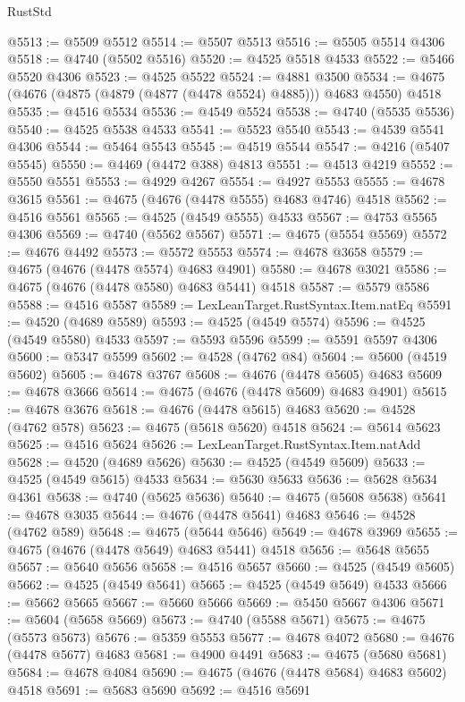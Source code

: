 \begin{lexlean}{RustStd}
\begin{coremodule}
{\begin{coremodule}
{{{{{{{{{{{{{{{{{{{{{{{{{{{{{{{{{{{{{{{{{{{{{{{{{{{{{{{{{{{{@5513 := @5509 @5512
@5514 := @5507 @5513
@5516 := @5505 @5514 @4306
@5518 := @4740 (@5502 @5516)
@5520 := @4525 @5518 @4533
@5522 := @5466 @5520 @4306
@5523 := @4525 @5522
@5524 := @4881 @3500
@5534 := @4675 (@4676 (@4875 (@4879 (@4877 (@4478 @5524) @4885))) @4683 @4550) @4518
@5535 := @4516 @5534
@5536 := @4549 @5524
@5538 := @4740 (@5535 @5536)
@5540 := @4525 @5538 @4533
@5541 := @5523 @5540
@5543 := @4539 @5541 @4306
@5544 := @5464 @5543
@5545 := @4519 @5544
@5547 := @4216 (@5407 @5545)
@5550 := @4469 (@4472 @388) @4813
@5551 := @4513 @4219
@5552 := @5550 @5551
@5553 := @4929 @4267
@5554 := @4927 @5553
@5555 := @4678 @3615
@5561 := @4675 (@4676 (@4478 @5555) @4683 @4746) @4518
@5562 := @4516 @5561
@5565 := @4525 (@4549 @5555) @4533
@5567 := @4753 @5565 @4306
@5569 := @4740 (@5562 @5567)
@5571 := @4675 (@5554 @5569)
@5572 := @4676 @4492
@5573 := @5572 @5553
@5574 := @4678 @3658
@5579 := @4675 (@4676 (@4478 @5574) @4683 @4901)
@5580 := @4678 @3021
@5586 := @4675 (@4676 (@4478 @5580) @4683 @5441) @4518
@5587 := @5579 @5586
@5588 := @4516 @5587
@5589 := LexLeanTarget.RustSyntax.Item.natEq
@5591 := @4520 (@4689 @5589)
@5593 := @4525 (@4549 @5574)
@5596 := @4525 (@4549 @5580) @4533
@5597 := @5593 @5596
@5599 := @5591 @5597 @4306
@5600 := @5347 @5599
@5602 := @4528 (@4762 @84)
@5604 := @5600 (@4519 @5602)
@5605 := @4678 @3767
@5608 := @4676 (@4478 @5605) @4683
@5609 := @4678 @3666
@5614 := @4675 (@4676 (@4478 @5609) @4683 @4901)
@5615 := @4678 @3676
@5618 := @4676 (@4478 @5615) @4683
@5620 := @4528 (@4762 @578)
@5623 := @4675 (@5618 @5620) @4518
@5624 := @5614 @5623
@5625 := @4516 @5624
@5626 := LexLeanTarget.RustSyntax.Item.natAdd
@5628 := @4520 (@4689 @5626)
@5630 := @4525 (@4549 @5609)
@5633 := @4525 (@4549 @5615) @4533
@5634 := @5630 @5633
@5636 := @5628 @5634 @4361
@5638 := @4740 (@5625 @5636)
@5640 := @4675 (@5608 @5638)
@5641 := @4678 @3035
@5644 := @4676 (@4478 @5641) @4683
@5646 := @4528 (@4762 @589)
@5648 := @4675 (@5644 @5646)
@5649 := @4678 @3969
@5655 := @4675 (@4676 (@4478 @5649) @4683 @5441) @4518
@5656 := @5648 @5655
@5657 := @5640 @5656
@5658 := @4516 @5657
@5660 := @4525 (@4549 @5605)
@5662 := @4525 (@4549 @5641)
@5665 := @4525 (@4549 @5649) @4533
@5666 := @5662 @5665
@5667 := @5660 @5666
@5669 := @5450 @5667 @4306
@5671 := @5604 (@5658 @5669)
@5673 := @4740 (@5588 @5671)
@5675 := @4675 (@5573 @5673)
@5676 := @5359 @5553
@5677 := @4678 @4072
@5680 := @4676 (@4478 @5677) @4683
@5681 := @4900 @4491
@5683 := @4675 (@5680 @5681)
@5684 := @4678 @4084
@5690 := @4675 (@4676 (@4478 @5684) @4683 @5602) @4518
@5691 := @5683 @5690
@5692 := @4516 @5691
}}}}}}}}}}}}}}}}}}}}}}}}}}}}}}}}}}}}}}}}}}}}}}}}}}}}}}}}}}}}
\end{coremodule}}
\end{coremodule}
\end{lexlean}

